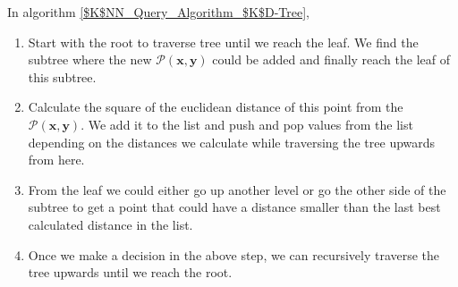 In algorithm \ref{$K$NN_Query_Algorithm_$K$D-Tree},
\begin{enumerate}
    \item Start with the root to traverse tree until we reach the leaf. We find the subtree where the new $\mathcal{P}(\boldsymbol{x}, \boldsymbol{y})$ could be added and finally reach the leaf of this subtree. 

    \item Calculate the square of the euclidean distance of this point from the $\mathcal{P}(\boldsymbol{x}, \boldsymbol{y})$. We add it to the list and push and pop values from the list depending on the distances we calculate while traversing the tree upwards from here.
    
    \item From the leaf we could either go up another level or go the other side of the subtree to get a point that could have a distance smaller than the last best calculated distance in the list. 
    
    \item Once we make a decision in the above step, we can recursively traverse the tree upwards until we reach the root. 
\end{enumerate}


